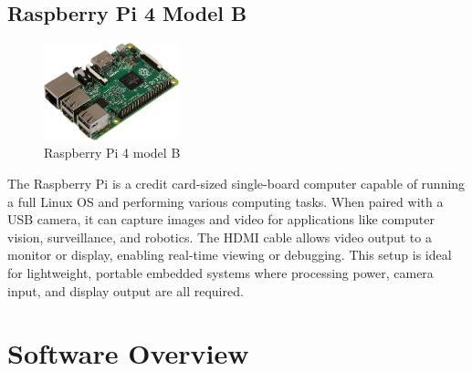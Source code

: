 \subsection{Raspberry Pi 4 Model B}
\begin{figure}[H]
\centering
\includegraphics[width=0.35\textwidth]{images/raspimg.jpg}
\caption{Raspberry Pi 4 model B}
\end{figure}
The Raspberry Pi is a credit card-sized single-board computer capable of running a full Linux OS and performing various computing tasks. When paired with a USB camera, it can capture images and video for applications like computer vision, surveillance, and robotics. The HDMI cable allows video output to a monitor or display, enabling real-time viewing or debugging. This setup is ideal for lightweight, portable embedded systems where processing power, camera input, and display output are all required.

\section{Software Overview}

